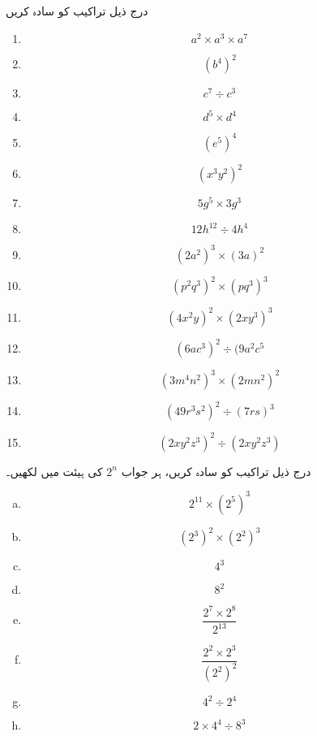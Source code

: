 درج ذیل تراکیب کو سادہ کریں
\begin{multicols}{3}
\begin{enumerate}[.a]
\item
\[a^{2}\times a^{3}\times a^{7}\]
\item
\[(b^{4})^{2}\]
\item
\[c^{7}\div c^{3}\]
\item
\[d^{5}\times d^{4}\]
\item
\[(e^{5})^{4}\]
\item
\[(x^{3}y^{2})^{2}\]
\item
\[5g^{5}\times3g^{3}\]
\item
\[12h^{12}\div 4h^{4}\]
\item
\[(2a^{2})^{3}\times(3a)^{2}\]
\item
\[(p^{2}q^{3})^{2}\times(pq^{3})^{3}\]
\item
\[(4x^{2}y)^{2}\times(2xy^{3})^{3}\]
\item
\[(6ac^{3})^{2}\div(9a^{2}c^{5}\]
\item
\[(3m^{4}n^{2})^{3}\times(2mn^{2})^{2}\]
\item
\[(49r^{3}s^{2})^{2}\div(7rs)^{3}\]
\item
\[(2xy^{2}z^{3})^{2}\div(2xy^{2}z^{3})\]

\end{enumerate}
\end{multicols}


درج ذیل تراکیب کو سادہ کریں، ہر جواب 
\(2^{n}\) کی  ہیئت میں لکھیں۔

\begin{multicols}{2}
\begin{enumerate}[a.]
\item
\[2^{11}\times(2^{5})^{3}\]
\item
\[(2^{3})^{2}\times(2^{2})^{3}\]
\item
\[4^{3}\]
\item
\[8^{2}\]
\item
\[\frac{2^{7}\times 2^{8}}{2^{13}}\]
\item
\[\frac{2^{2}\times 2^{3}}{(2^{2})^{2}}\]
\item
\[4^{2}\div 2^{4}\]
\item
\[2\times 4^{4}\div 8^{3}\]
\end{enumerate}
\end{multicols}

